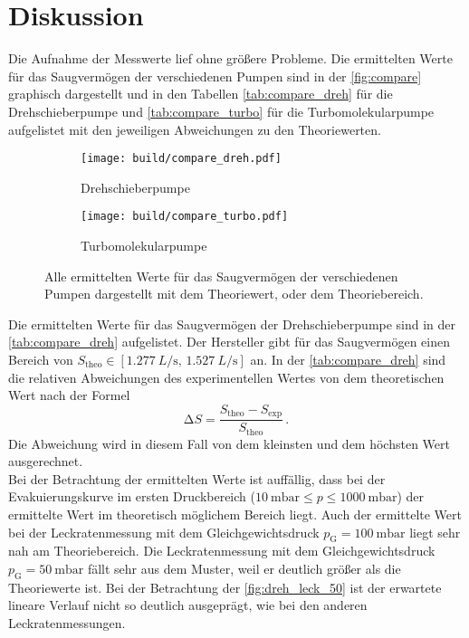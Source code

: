 \section{Diskussion}
\label{sec:Diskussion}

\noindent Die Aufnahme der Messwerte lief ohne größere Probleme. Die ermittelten Werte für das Saugvermögen der verschiedenen Pumpen sind in der \autoref{fig:compare} 
graphisch dargestellt und in den Tabellen \ref{tab:compare_dreh} für die Drehschieberpumpe und \ref{tab:compare_turbo} für die Turbomolekularpumpe
aufgelistet mit den jeweiligen Abweichungen zu den Theoriewerten.

\begin{figure}[h]
    \begin{subfigure}{0.48\textwidth}
        \centering
        \texttt{[image: build/compare\_dreh.pdf]}
        \caption{Drehschieberpumpe}
        \label{fig:saug_dreh}
    \end{subfigure}
    \hfill 
    \begin{subfigure}{0.48\textwidth}
        \centering
        \texttt{[image: build/compare\_turbo.pdf]}
        \caption{Turbomolekularpumpe}
        \label{fig:saug_turbo}
    \end{subfigure}
    \caption{Alle ermittelten Werte für das Saugvermögen der verschiedenen Pumpen dargestellt mit dem Theoriewert, oder dem Theoriebereich.}
    \label{fig:compare}
\end{figure}

\noindent Die ermittelten Werte für das Saugvermögen der Drehschieberpumpe sind in der \autoref{tab:compare_dreh} aufgelistet. Der Hersteller gibt für das Saugvermögen einen Bereich 
von $ S_\text{theo} \in [\SI{1.277}{L\per\second},\, \SI{1.527}{L\per\second}]$ an. In der \autoref{tab:compare_dreh} sind die relativen Abweichungen des experimentellen Wertes von 
dem theoretischen Wert nach der Formel 
\begin{equation}
    \increment S = \frac{S_\text{theo} - S_\text{exp}}{S_\text{theo}}\, .
    \label{eqn:rel_abw}
\end{equation}
Die Abweichung wird in diesem Fall von dem kleinsten und dem höchsten Wert ausgerechnet. \\
Bei der Betrachtung der ermittelten Werte ist auffällig, dass bei der Evakuierungskurve im ersten Druckbereich ($\SI{10}{\milli\bar} \leq p \leq \SI{1000}{\milli\bar}$) der ermittelte 
Wert im theoretisch möglichem Bereich liegt. Auch der ermittelte Wert bei der Leckratenmessung mit dem Gleichgewichtsdruck $p_\text{G} = \SI{100}{\milli\bar}$ liegt sehr nah am Theoriebereich. 
Die Leckratenmessung mit dem Gleichgewichtsdruck $p_\text{G} = \SI{50}{\milli\bar}$ fällt sehr aus dem Muster, weil er deutlich größer als die Theoriewerte ist. Bei der Betrachtung der
\autoref{fig:dreh_leck_50} ist der erwartete lineare Verlauf nicht so deutlich ausgeprägt, wie bei den anderen Leckratenmessungen. 

